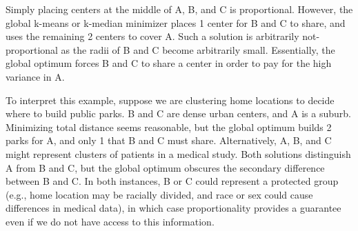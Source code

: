 Simply placing centers at the middle of A, B, and C is proportional. However, the global k-means or k-median minimizer places 1 center for B and C to share, and uses the remaining 2 centers to cover A. Such a solution is arbitrarily not-proportional as the radii of B and C become arbitrarily small. Essentially, the global optimum forces B and C to share a center in order to pay for the high variance in A. 

To interpret this example, suppose we are clustering home locations to decide where to build public parks. B and C are dense urban centers, and A is a suburb. Minimizing total distance seems reasonable, but the global optimum builds 2 parks for A, and only 1 that B and C must share. Alternatively, A, B, and C might represent clusters of patients in a medical study. Both solutions distinguish A from B and C, but the global optimum obscures the secondary difference between B and C. In both instances, B or C could represent a protected group (e.g., home location may be racially divided, and race or sex could cause differences in medical data), in which case proportionality provides a guarantee even if we do not have access to this information.




